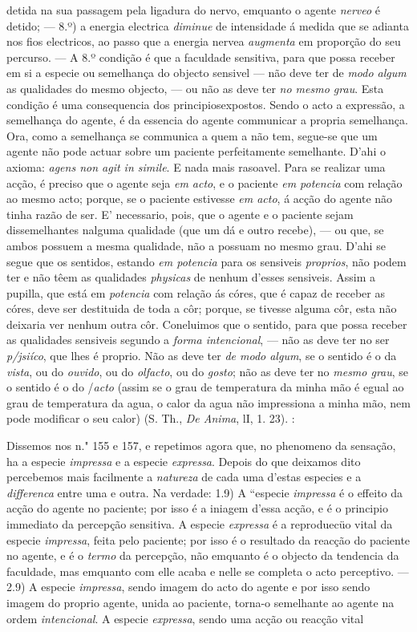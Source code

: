 detida na sua passagem pela ligadura do nervo, emquanto o agente \emph{nerveo} é detido; --- 8.º) a energia electrica \emph{diminue} de intensidade á medida que se adianta nos fios electricos, ao passo que a energia nervea \emph{augmenta} em proporção do seu percurso. --- A 8.º condição é que a faculdade sensitiva, para que possa receber em si a especie ou semelhança do objecto sensivel --- não deve ter de \emph{modo algum} as qualidades do mesmo objecto, --- ou não as deve ter \emph{no mesmo grau}. Esta condição é uma consequencia dos principiosexpostos. Sendo o acto a expressão, a semelhança do agente, é da essencia do agente communicar a propria semelhança. Ora, como a semelhança se communica a quem a não tem, segue-se que um agente não pode actuar sobre um paciente perfeitamente semelhante. D'ahi o axioma: \emph{agens non agit in simile}. E nada mais rasoavel. Para se realizar uma acção, é preciso que o agente seja \emph{em acto}, e o paciente \emph{em potencia} com relação ao mesmo acto; porque, se o paciente estivesse \emph{em acto}, á acção do agente não tinha razão de ser. E' necessario, pois, que o agente e o paciente sejam dissemelhantes nalguma qualidade (que um dá e outro recebe), --- ou que, se ambos possuem a mesma qualidade, não a possuam no mesmo grau. D'ahi se segue que os sentidos, estando \emph{em potencia} para os sensiveis \emph{proprios}, não podem ter e não têem as qualidades \emph{physicas} de nenhum d'esses sensiveis. Assim a pupilla, que está em \emph{potencia} com relação ás córes, que é capaz de receber as córes, deve ser destituida de toda a côr; porque, se tivesse alguma côr, esta não deixaria ver nenhum outra côr. Coneluimos que o sentido, para que possa receber as qualidades sensiveis segundo a \emph{forma intencional}, --- não as deve ter no ser \emph{p/jsiíco}, que lhes é proprio. Não as deve ter \emph{de modo algum}, se o sentido é o da \emph{vista}, ou do \emph{ouvido}, ou do \emph{olfacto}, ou do \emph{gosto}; não as deve ter no \emph{mesmo grau}, se o sentido é o do /\emph{acto} (assim se o grau de temperatura da minha mão é egual ao grau de temperatura da agua, o calor da agua não impressiona a minha mão, nem pode modificar o seu calor) (S. Th., \emph{De Anima}, lI, 1. 23). :\par Dissemos nos n." 155 e 157, e repetimos agora que, no phenomeno da sensação, ha a especie \emph{impressa} e a especie \emph{expressa}. Depois do que deixamos dito percebemos mais facilmente a \emph{natureza} de cada uma d'estas especies e a \emph{differenca} entre uma e outra. Na verdade: 1.9) A “especie \emph{impressa} é o effeito da acção do agente no paciente; por isso é a iniagem d'essa acção, e é o principio immediato da percepção sensitiva. A especie \emph{expressa} é a reproduecüo vital da especie \emph{impressa}, feita pelo paciente; por isso é o resultado da reacção do paciente no agente, e é o \emph{termo} da percepção, não emquanto é o objecto da tendencia da faculdade, mas emquanto com elle acaba e nelle se completa o acto perceptivo. --- 2.9) A especie \emph{impressa}, sendo imagem do acto do agente e por isso sendo imagem do proprio agente, unida ao paciente, torna-o semelhante ao agente na ordem \emph{intencional}. A especie \emph{expressa}, sendo uma acção ou reacção vital 